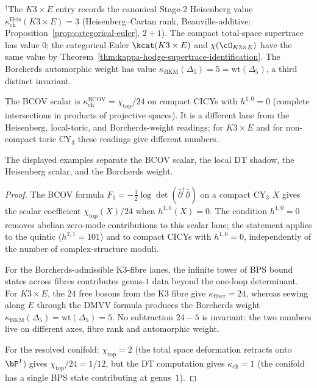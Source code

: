 \begin{theorem}[\texorpdfstring{$\chi_{\mathrm{top}}/24 \neq \kappa_{\mathrm{ch}}$}{chi-top/24 != kappa-ch} in general]
{$^\dagger$The $K3 \times E$ entry records the canonical Stage-2 Heisenberg value $\kappa_{\mathrm{ch}}^{\mathrm{Heis}}(K3 \times E) = 3$ (Heisenberg--Cartan rank, Beauville-additive: Proposition~\ref{prop:categorical-euler}, $2 + 1$). The compact total-space supertrace has value $0$; the categorical Euler $\kcat(K3 \times E)$ and $\chi(\cO_{K3 \times E})$ have the same value by Theorem~\ref{thm:kappa-hodge-supertrace-identification}. The Borcherds automorphic weight has value $\kappa_{\mathrm{BKM}}(\Delta_5) = 5 = \mathrm{wt}(\Delta_5)$, a third distinct invariant.}

\smallskip

\noindent The BCOV scalar is $\kappa_{\mathrm{ch}}^{\mathrm{BCOV}}=\chi_{\mathrm{top}}/24$ on compact CICYs with $h^{1,0}=0$ (complete intersections in products of projective spaces). It is a different lane from the Heisenberg, local-toric, and Borcherds-weight readings; for $K3\times E$ and for non-compact toric CY$_3$ these readings give different numbers.

The displayed examples separate the BCOV scalar, the local DT shadow,
the Heisenberg scalar, and the Borcherds weight.
\end{theorem}

\begin{proof}
The BCOV formula $F_1=-\tfrac{1}{2}\log\det(\bar{\partial}^\dagger\bar{\partial})$ on a compact CY$_3$ $X$ gives the scalar coefficient $\chi_{\mathrm{top}}(X)/24$ when $h^{1,0}(X)=0$. The condition $h^{1,0}=0$ removes abelian zero-mode contributions to this scalar lane; the statement applies to the quintic ($h^{2,1}=101$) and to compact CICYs with $h^{1,0}=0$, independently of the number of complex-structure moduli.

For the Borcherds-admissible K3-fibre lanes, the infinite tower of BPS bound states across fibres contributes genus-$1$ data beyond the one-loop determinant. For $K3 \times E$, the $24$ free bosons from the K3 fibre give $\kappa_{\mathrm{fiber}} = 24$, whereas sewing along $E$ through the DMVV formula produces the Borcherds weight $\kappa_{\mathrm{BKM}}(\Delta_5) = \mathrm{wt}(\Delta_5) = 5$. No subtraction $24-5$ is invariant: the two numbers live on different axes, fibre rank and automorphic weight.

For the resolved conifold: $\chi_{\mathrm{top}} = 2$ (the total space deformation retracts onto $\bP^1$) gives $\chi_{\mathrm{top}}/24 = 1/12$, but the DT computation gives $\kappa_{\mathrm{ch}} = 1$ (the conifold has a single BPS state contributing at genus~$1$).
\end{proof}

